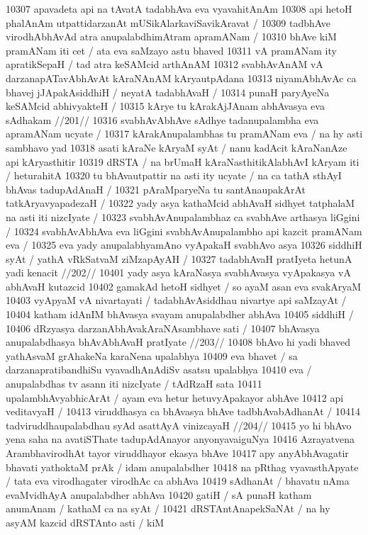 10307 apavadeta api na tAvatA tadabhAva eva vyavahitAnAm
10308 api hetoH phalAnAm utpattidarzanAt mUSikAlarkaviSavikAravat / 
10309 tadbhAve virodhAbhAvAd atra anupalabdhimAtram apramANam /  
10310 bhAve kiM pramANam iti cet / ata eva saMzayo astu bhaved 
10311 vA pramANam ity apratikSepaH / tad atra keSAMcid arthAnAM
10312 svabhAvAnAM vA darzanapATavAbhAvAt kAraNAnAM kAryautpAdana
10313 niyamAbhAvAc ca bhavej jJApakAsiddhiH / neyatA tadabhAvaH /  
10314 punaH paryAyeNa keSAMcid abhivyakteH / 
10315 	kArye tu kArakAjJAnam abhAvasya eva sAdhakam //201// 
10316 svabhAvAbhAve sAdhye tadanupalambha eva apramANam ucyate /
10317 kArakAnupalambhas tu pramANam eva / na hy asti sambhavo yad  
10318 asati kAraNe kAryaM syAt / nanu kadAcit kAraNanAze api kAryasthitir
10319 dRSTA / na brUmaH kAraNasthitikAlabhAvI kAryam iti / heturahitA
10320 tu bhAvautpattir na asti ity ucyate / na ca tathA sthAyI bhAvas tadupAdAnaH /
10321 pAraMparyeNa tu santAnaupakArAt tatkAryavyapadezaH /  
10322 yady asya kathaMcid abhAvaH sidhyet tatphalaM na asti iti nizcIyate /  
10323 	svabhAvAnupalambhaz ca svabhAve arthasya liGgini /
10324 svabhAvAbhAva eva liGgini svabhAvAnupalambho api kazcit pramANam eva /
10325 eva yady anupalabhyamAno vyApakaH svabhAvo asya
10326 siddhiH syAt / yathA vRkSatvaM ziMzapAyAH /
10327 	tadabhAvaH pratIyeta hetunA yadi kenacit //202//  
10401 yady asya kAraNasya svabhAvasya vyApakasya vA abhAvaH kutazcid 
10402 gamakAd hetoH sidhyet / so ayaM asan eva svakAryaM  
10403 vyApyaM vA nivartayati / tadabhAvAsiddhau nivartye api saMzayAt /  
10404 katham idAnIM bhAvasya svayam anupalabdher abhAva  
10405 siddhiH /  
10406 	dRzyasya darzanAbhAvakAraNAsambhave sati /  
10407 	bhAvasya anupalabdhasya bhAvAbhAvaH pratIyate //203// 
10408 bhAvo hi yadi bhaved yathAsvaM grAhakeNa karaNena upalabhya
10409 eva bhavet / sa darzanapratibandhiSu vyavadhAnAdiSv asatsu upalabhya 
10410 eva / anupalabdhas tv asann iti nizcIyate / tAdRzaH sata 
10411 upalambhAvyabhicArAt / ayam eva hetur hetuvyApakayor abhAve  
10412 api veditavyaH / 
10413 	viruddhasya ca bhAvasya bhAve tadbhAvabAdhanAt /  
10414 	tadviruddhaupalabdhau syAd asattAyA vinizcayaH //204// 
10415 yo hi bhAvo yena saha na avatiSThate tadupAdAnayor anyonyavaiguNya  
10416 Azrayatvena ArambhavirodhAt tayor viruddhayor ekasya bhAve  
10417 apy anyAbhAvagatir bhavati yathoktaM prAk / idam anupalabdher  
10418 na pRthag vyavasthApyate / tata eva virodhagater virodhAc ca abhAva  
10419 sAdhanAt / bhavatu nAma evaMvidhAyA anupalabdher abhAva
10420 gatiH / sA punaH katham anumAnam / kathaM ca na syAt /  
10421 dRSTAntAnapekSaNAt / na hy asyAM kazcid dRSTAnto asti / kiM
